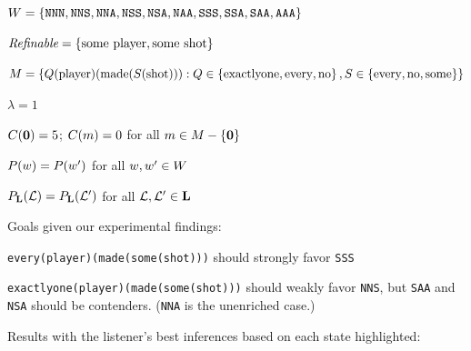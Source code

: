 \documentclass{article}
\begin{document}
\begin{examples}
\item

 \begin{examples}
  \item $W = \left\{ \texttt{NNN}, \texttt{NNS}, \texttt{NNA}, \texttt{NSS}, \texttt{NSA}, \texttt{NAA}, \texttt{SSS}, \texttt{SSA}, \texttt{SAA}, \texttt{AAA} \right\}$    
  \item $\textit{Refinable} = \left\{ \text{some player}, \text{some shot} \right\}$
  \item $M = \left\{ Q(\text{player})(\text{made}(S(\text{shot}))) : Q \in \left\{ \text{exactlyone}, \text{every}, \text{no} \right\}, S \in  \left\{ \text{every}, \text{no}, \text{some} \right\} \right\}$
  \item $\lambda = 1$
  \item $C(\mathbf{0}) = 5$; $C(m) = 0$ for all $m \in M-\left\{ \mathbf{0} \right\}$  
  \item $P(w) = P(w')$ for all $w, w' \in W$
  \item $P_{\mathbf{L}}(\mathcal{L}) = P_{\mathbf{L}}(\mathcal{L}')$ for all $\mathcal{L}, \mathcal{L}' \in \mathbf{L}$
  \end{examples}

\item Goals given our experimental findings:
  \begin{examples}
  \item \texttt{every(player)(made(some(shot)))} should strongly favor \texttt{SSS}
  \item \texttt{exactlyone(player)(made(some(shot)))} should weakly favor \texttt{NNS}, but \texttt{SAA} and \texttt{NSA} should be contenders.
    (\texttt{NNA} is the unenriched case.)
  \end{examples}


\item Results with the listener's best inferences based on each state
  highlighted:


\end{examples}
\end{document}
